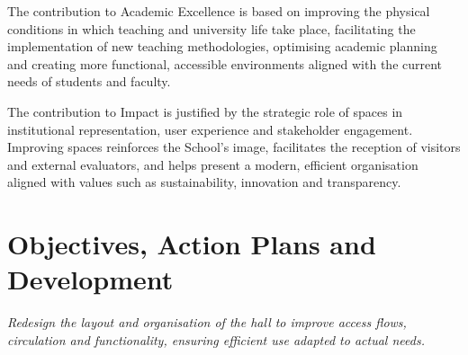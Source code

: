 \documentclass[11pt,a4paper]{scrreprt}
\begin{document}
The contribution to Academic Excellence is based on improving the physical conditions in which teaching and university life take place, facilitating the implementation of new teaching methodologies, optimising academic planning and creating more functional, accessible environments aligned with the current needs of students and faculty.

The contribution to Impact is justified by the strategic role of spaces in institutional representation, user experience and stakeholder engagement. Improving spaces reinforces the School's image, facilitates the reception of visitors and external evaluators, and helps present a modern, efficient organisation aligned with values such as sustainability, innovation and transparency.
\newpage
{}
\section{Objectives, Action Plans and Development}
{\small\color{mutedcolor}\itshape Redesign the layout and organisation of the hall to improve access flows, circulation and functionality, ensuring efficient use adapted to actual needs.}\par\vspace{6pt}
\end{document}
